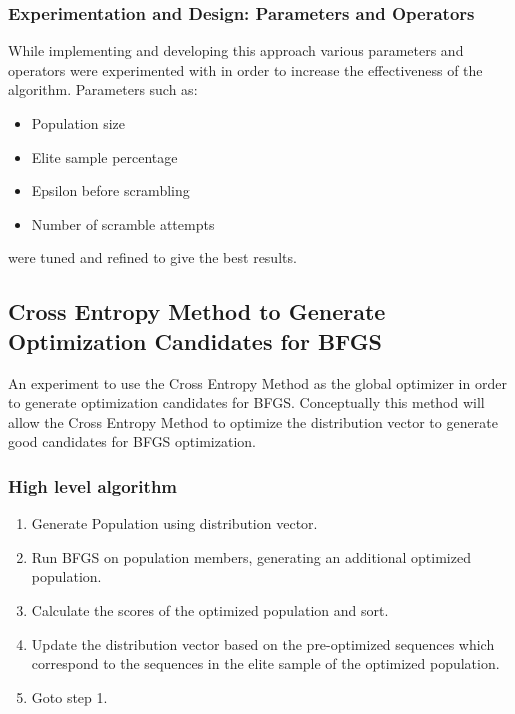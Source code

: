 \documentclass[11pt]{article}
\begin{document}
    \subsubsection{Experimentation and Design: Parameters and Operators}
    While implementing and developing this approach various parameters and operators were experimented with in order to increase the effectiveness of the algorithm. Parameters such as:
    \begin{itemize}
        \item Population size
        \item Elite sample percentage
        \item Epsilon before scrambling
        \item Number of scramble attempts
    \end{itemize}
    were tuned and refined to give the best results.

    \clearpage
    \subsection{Cross Entropy Method to Generate Optimization Candidates for BFGS}
    \par An experiment to use the Cross Entropy Method as the global optimizer in order to generate optimization candidates for BFGS. Conceptually this method will allow the Cross Entropy Method to optimize the distribution vector to generate good candidates for BFGS optimization.
    \subsubsection{High level algorithm}
    \begin{enumerate}
        \item Generate Population using distribution vector.
        \item Run BFGS on population members, generating an additional optimized population.
        \item Calculate the scores of the optimized population and sort.
        \item Update the distribution vector based on the pre-optimized sequences which correspond to the sequences in the elite sample of the optimized population.
        \item Goto step 1.
    \end{enumerate}
\end{document}

